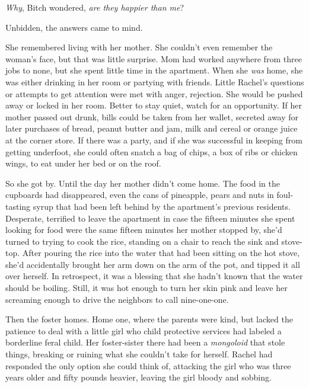 \emph{Why}, Bitch wondered, \emph{are they happier than me}?



Unbidden, the answers came to mind.



She remembered living with her mother.  She couldn't even remember the woman's face, but that was little surprise.  Mom had worked anywhere from three jobs to none, but she spent little time in the apartment.  When she \emph{was} home, she was either drinking in her room or partying with friends.  Little Rachel's questions or attempts to get attention were met with anger, rejection.  She would be pushed away or locked in her room.  Better to stay quiet, watch for an opportunity.  If her mother passed out drunk, bills could be taken from her wallet, secreted away for later purchases of bread, peanut butter and jam, milk and cereal or orange juice at the corner store.  If there was a party, and if she was successful in keeping from getting underfoot, she could often snatch a bag of chips, a box of ribs or chicken wings, to eat under her bed or on the roof.



So she got by.  Until the day her mother didn't come home.  The food in the cupboards had disappeared, even the cans of pineapple, pears and nuts in foul-tasting syrup that had been left behind by the apartment's previous residents.  Desperate, terrified to leave the apartment in case the fifteen minutes she spent looking for food were the same fifteen minutes her mother stopped by, she'd turned to trying to cook the rice, standing on a chair to reach the sink and stove-top.  After pouring the rice into the water that had been sitting on the hot stove, she'd accidentally brought her arm down on the arm of the pot, and tipped it all over herself.  In retrospect, it was a blessing that she hadn't known that the water should be boiling.  Still, it was hot enough to turn her skin pink and leave her screaming enough to drive the neighbors to call nine-one-one.



Then the foster homes.  Home one, where the parents were kind, but lacked the patience to deal with a little girl who child protective services had labeled a borderline feral child.  Her foster-sister there had been a \emph{mongoloid} that stole things, breaking or ruining what she couldn't take for herself.  Rachel had responded the only option she could think of, attacking the girl who was three years older and fifty pounds heavier, leaving the girl bloody and sobbing.



